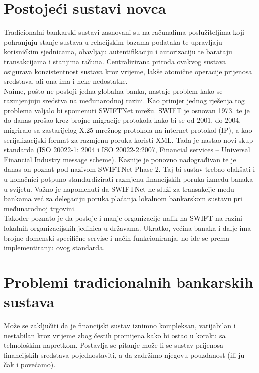 \documentclass[utf8, zavrsni]{fer}
\begin{document}
\section{Postojeći sustavi novca}
Tradicionalni bankarski sustavi zasnovani su na računalima poslužiteljima koji pohranjuju stanje sustava u relacijskim bazama podataka te upravljaju korisničkim sjednicama, obavljaju autentifikaciju i autorizaciju te barataju transakcijama i stanjima računa. Centralizirana priroda ovakvog sustava osigurava konzistentnost sustava kroz vrijeme, lakše atomične operacije prijenosa sredstava, ali ona ima i neke nedostatke. \\
Naime, pošto ne postoji jedna globalna banka, nastaje problem kako se razmjenjuju sredstva na međunarodnoj razini. Kao primjer jednog rješenja tog problema valjalo bi spomenuti SWIFTNet mrežu. SWIFT je osnovan 1973. te je do danas prošao kroz brojne migracije protokola kako bi se od 2001. do 2004. migriralo sa zastarijelog X.25 mrežnog protokola na internet protokol (IP), a kao serijalizacijski format za razmjenu poruka koristi XML. Tada je nastao novi skup standarda (ISO 20022-1: 2004 i ISO 20022-2:2007, Financial services – Universal Financial Industry message scheme). Kasnije je ponovno nadograđivan te je danas on poznat pod nazivom SWIFTNet Phase 2. Taj bi sustav trebao olakšati i u konačnici potpuno standardizirati razmjenu financijskih poruka između banaka u svijetu. Važno je napomenuti da SWIFTNet ne služi za transakcije među bankama već za delegaciju poruka plaćanja lokalnom bankarskom sustavu pri međunarodnoj trgovini. \\ 

Također poznato je da postoje i manje organizacije nalik na SWIFT na razini lokalnih organizacijskih jedinica u državama. Ukratko, većina banaka i dalje ima brojne domenski specifične servise i način funkcioniranja, no ide se prema implementiranju ovog standarda.

\section{Problemi tradicionalnih bankarskih sustava}
	
Može se zaključiti da je financijski sustav iznimno kompleksan, varijabilan i nestabilan kroz vrijeme zbog čestih promijena kako bi ostao u koraku sa tehnološkim napretkom. Postavlja se pitanje može li se sustav prijenosa financijskih sredstava pojednostaviti, a da zadržimo njegovu pouzdanost (ili ju čak i povećamo). \\
\end{document}
